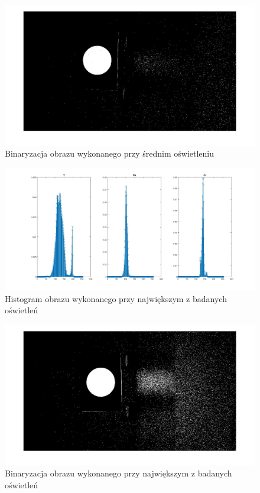 \begin{figure}[h]
	\centering
	\includegraphics[width=\textwidth]{bin2.jpg}
	\caption{Binaryzacja obrazu wykonanego przy średnim oświetleniu}
	\label{fig:bin2}
\end{figure}
\begin{figure}[h]
	\centering
	\includegraphics[width=\textwidth]{hist3.jpg}
	\caption{Histogram obrazu wykonanego przy największym z badanych oświetleń}
	\label{fig:hist3}
\end{figure}
\begin{figure}[h]
	\centering
	\includegraphics[width=\textwidth]{bin3.jpg}
	\caption{Binaryzacja obrazu wykonanego przy największym z badanych oświetleń}
	\label{fig:bin3}
\end{figure}

